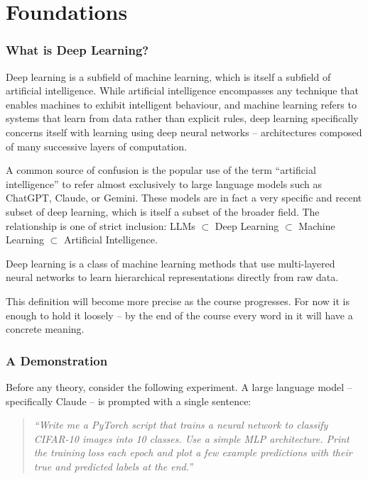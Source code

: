 \part{Foundations}

\section{What is Deep Learning?}

Deep learning is a subfield of machine learning, which is itself a subfield of artificial intelligence. While artificial intelligence encompasses any technique that enables machines to exhibit intelligent behaviour, and machine learning refers to systems that learn from data rather than explicit rules, deep learning specifically concerns itself with learning using deep neural networks -- architectures composed of many successive layers of computation.

A common source of confusion is the popular use of the term ``artificial intelligence'' to refer almost exclusively to large language models such as ChatGPT, Claude, or Gemini. These models are in fact a very specific and recent subset of deep learning, which is itself a subset of the broader field. The relationship is one of strict inclusion: LLMs $\subset$ Deep Learning $\subset$ Machine Learning $\subset$ Artificial Intelligence.

\begin{definition}
Deep learning is a class of machine learning methods that use multi-layered neural networks to learn hierarchical representations directly from raw data.
\end{definition}

This definition will become more precise as the course progresses. For now it is enough to hold it loosely -- by the end of the course every word in it will have a concrete meaning.

\section{A Demonstration}

Before any theory, consider the following experiment. A large language model -- specifically Claude -- is prompted with a single sentence:

\begin{quote}
\textit{``Write me a PyTorch script that trains a neural network to classify CIFAR-10 images into 10 classes. Use a simple MLP architecture. Print the training loss each epoch and plot a few example predictions with their true and predicted labels at the end.''}
\end{quote}

